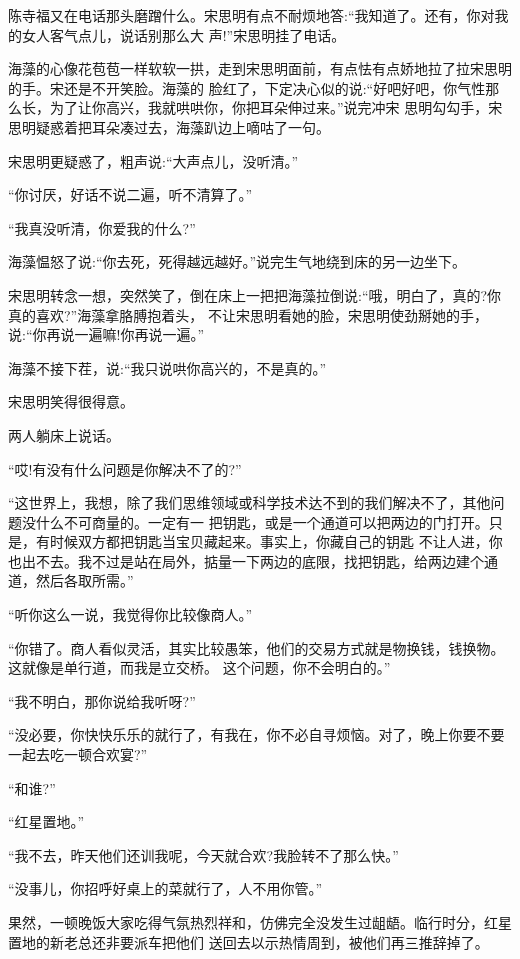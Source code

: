 \documentclass[11pt,a4paper,onecolumn]{article}
\begin{document}
陈寺福又在电话那头磨蹭什么。宋思明有点不耐烦地答:``我知道了。还有，你对我的女人客气点儿，说话别那么大
声!''宋思明挂了电话。

海藻的心像花苞苞一样软软一拱，走到宋思明面前，有点怯有点娇地拉了拉宋思明的手。宋还是不开笑脸。海藻的
脸红了，下定决心似的说:``好吧好吧，你气性那么长，为了让你高兴，我就哄哄你，你把耳朵伸过来。''说完冲宋
思明勾勾手，宋思明疑惑着把耳朵凑过去，海藻趴边上嘀咕了一句。

宋思明更疑惑了，粗声说:``大声点儿，没听清。''

``你讨厌，好话不说二遍，听不清算了。''

``我真没听清，你爱我的什么?''

海藻愠怒了说:``你去死，死得越远越好。''说完生气地绕到床的另一边坐下。

宋思明转念一想，突然笑了，倒在床上一把把海藻拉倒说:``哦，明白了，真的?你真的喜欢?''海藻拿胳膊抱着头，
不让宋思明看她的脸，宋思明使劲掰她的手，说:``你再说一遍嘛!你再说一遍。''

海藻不接下茬，说:``我只说哄你高兴的，不是真的。''

宋思明笑得很得意。

两人躺床上说话。

``哎!有没有什么问题是你解决不了的?''

``这世界上，我想，除了我们思维领域或科学技术达不到的我们解决不了，其他问题没什么不可商量的。一定有一
把钥匙，或是一个通道可以把两边的门打开。只是，有时候双方都把钥匙当宝贝藏起来。事实上，你藏自己的钥匙
不让人进，你也出不去。我不过是站在局外，掂量一下两边的底限，找把钥匙，给两边建个通道，然后各取所需。''

``听你这么一说，我觉得你比较像商人。''

``你错了。商人看似灵活，其实比较愚笨，他们的交易方式就是物换钱，钱换物。这就像是单行道，而我是立交桥。
这个问题，你不会明白的。''

``我不明白，那你说给我听呀?''

``没必要，你快快乐乐的就行了，有我在，你不必自寻烦恼。对了，晚上你要不要一起去吃一顿合欢宴?''

``和谁?''

``红星置地。''

``我不去，昨天他们还训我呢，今天就合欢?我脸转不了那么快。''

``没事儿，你招呼好桌上的菜就行了，人不用你管。''

果然，一顿晚饭大家吃得气氛热烈祥和，仿佛完全没发生过龃龉。临行时分，红星置地的新老总还非要派车把他们
送回去以示热情周到，被他们再三推辞掉了。
\end{document}
